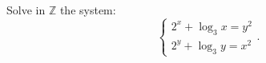 Solve in $ \mathbb{Z} $ the system:
$$ \left\{  \begin{matrix} 2^x+\log_3 x=y^2 \\ 2^y+\log_3 y=x^2 \end{matrix} \right. . $$